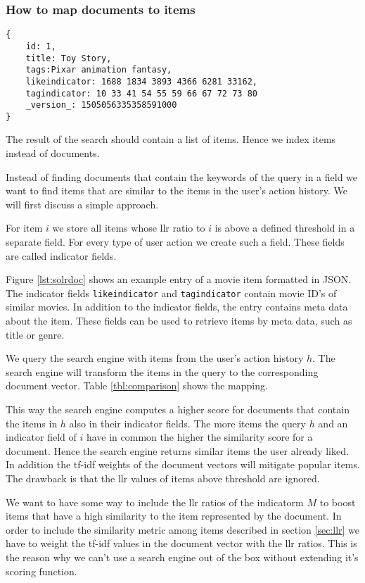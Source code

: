 \subsubsection{How to map documents to items}

\begin{lstlisting}[caption={Item meta data and similar items are stored in Solr.},label={lst:solrdoc}]
{
    id: 1,
    title: Toy Story,
    tags:Pixar animation fantasy,
    likeindicator: 1688 1834 3893 4366 6281 33162,
    tagindicator: 10 33 41 54 55 59 66 67 72 73 80
    _version_: 1505056335358591000
}
\end{lstlisting}

The result of the search should contain a list of items. Hence we index items instead of documents.

Instead of finding documents that contain the keywords of the query in a field we want to find items that are similar to the items in the user's action history. We will first discuss a simple approach. 

For item $i$ we store all items whose \gls{llr} ratio to $i$ is above a defined threshold in a separate field. For every type of user action we create such a field. These fields are called indicator fields. 

Figure \ref{lst:solrdoc} shows an example entry of a movie item formatted in JSON. The indicator fields \verb|likeindicator| and \verb|tagindicator| contain movie ID's of similar movies. In addition to the indicator fields, the entry contains meta data about the item. These fields can be used to retrieve items by meta data, such as title or genre.

We query the search engine with items from the user's action history $h$. The search engine will transform the items in the query to the corresponding document vector. Table \ref{tbl:comparison} shows the mapping.

This way the search engine computes a higher score for documents that contain the items in $h$ also in their indicator fields. The more items the query $h$ and an indicator field of $i$ have in common the higher the similarity score for a document. Hence the search engine returns similar items the user already liked. In addition the tf-idf weights of the document vectors will mitigate popular items. The drawback is that the \gls{llr} values of items above threshold are ignored.  

 We want to have some way to include the \gls{llr} ratios of the \gls{indicatorm} $M$ to boost items that have a high similarity to the item represented by the document. In order to include the similarity metric among items described in section \ref{sec:llr} we have to weight the tf-idf values in the document vector with the \gls{llr} ratios. This is the reason why we can't use a search engine out of the box without extending it's scoring function. 

